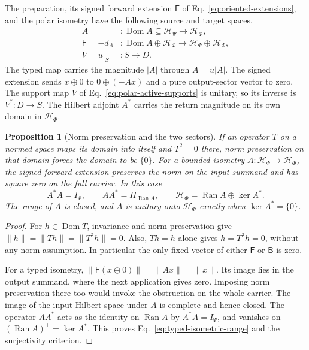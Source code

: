 \documentclass[11pt]{article}
\newtheorem{proposition}{Proposition}[section]
\theoremstyle{definition}
\DeclareMathOperator{\Ran}{Ran}
\begin{document}
The preparation, its signed forward extension $\mathsf F$ of Eq.~\eqref{eq:oriented-extensions}, and the polar isometry have the following source and target spaces.
\begin{equation}
 \begin{aligned}
 A &: \operatorname{Dom}A\subseteq\mathcal H_\Psi\longrightarrow\mathcal H_\Phi,\\
 \mathsf F=-d_A &: \operatorname{Dom}A\oplus\mathcal H_\Phi\longrightarrow
                 \mathcal H_\Psi\oplus\mathcal H_\Phi,\\
 V=u|_S &: S\longrightarrow D .
 \end{aligned}
 \label{eq:typed-odd-polar}
\end{equation}
The typed map carries the magnitude $|A|$ through $A=u|A|$. The signed extension sends $x\oplus0$ to $0\oplus(-Ax)$ and a pure output-sector vector to zero. The support map $V$ of Eq.~\eqref{eq:polar-active-supports} is unitary, so its inverse is $V^*:D\to S$. The Hilbert adjoint $A^*$ carries the return magnitude on its own domain in $\mathcal H_\Phi$.

\begin{proposition}[Norm preservation and the two sectors]
\label{prop:typed-odd-isometry}
If an operator $T$ on a normed space maps its domain into itself and $T^2=0$ there, norm preservation on that domain forces the domain to be $\{0\}$. For a bounded isometry $A:\mathcal H_\Psi\to\mathcal H_\Phi$, the signed forward extension preserves the norm on the input summand and has square zero on the full carrier. In this case
\begin{equation}
 A^*A=I_\Psi,\qquad AA^*=\Pi_{\Ran A},\qquad
 \mathcal H_\Phi=\Ran A\oplus\ker A^* .
 \label{eq:typed-isometric-range}
\end{equation}
The range of $A$ is closed, and $A$ is unitary onto $\mathcal H_\Phi$ exactly when $\ker A^*=\{0\}$.
\end{proposition}
\begin{proof}
For $h\in\operatorname{Dom}T$, invariance and norm preservation give $\|h\|=\|Th\|=\|T^2h\|=0$. Also, $Th=h$ alone gives $h=T^2h=0$, without any norm assumption. In particular the only fixed vector of either $\mathsf F$ or $\mathsf B$ is zero.

For a typed isometry, $\|\mathsf F(x\oplus0)\|=\|Ax\|=\|x\|$. Its image lies in the output summand, where the next application gives zero. Imposing norm preservation there too would invoke the obstruction on the whole carrier. The image of the input Hilbert space under $A$ is complete and hence closed. The operator $AA^*$ acts as the identity on $\Ran A$ by $A^*A=I_\Psi$, and vanishes on $(\Ran A)^\perp=\ker A^*$. This proves Eq.~\eqref{eq:typed-isometric-range} and the surjectivity criterion.
\end{proof}
\end{document}
